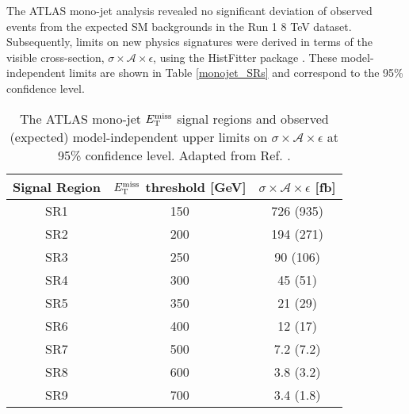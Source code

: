 The ATLAS mono-jet analysis revealed no significant deviation of observed events from the expected SM backgrounds in the Run 1 8 TeV dataset. Subsequently, limits on new physics signatures were derived in terms of the visible cross-section, $\sigma\times\mathcal{A}\times\epsilon$, using the HistFitter package \cite{}. These model-independent limits are shown in Table \ref{monojet_SRs} and correspond to the 95\% confidence level.

\begin{table}[!htbp]
\centering
\begin{tabular}{c|c|c}
 \hline
 \hline
 Signal Region & $E_{\mathrm{T}}^{\mathrm{miss}}$ threshold [GeV] & $\sigma \times \mathcal{A} \times \epsilon$ [fb] \\ %
 \hline
 SR1 & 150 & 726 (935) \\ %
 SR2 & 200 & 194 (271) \\ %
 SR3 & 250 & 90 (106) \\ %
 SR4 & 300 & 45 (51) \\ %
 SR5 & 350 & 21 (29) \\ %
 SR6 & 400 & 12 (17) \\ %
 SR7 & 500 & 7.2 (7.2) \\ %
 SR8 & 600 & 3.8 (3.2) \\ %
 SR9 & 700 & 3.4 (1.8) \\ %
 \hline
 \hline
\end{tabular}
\caption{The ATLAS mono-jet $E_{\mathrm{T}}^{\mathrm{miss}}$ signal regions and  observed (expected) model-independent upper limits on $\sigma \times \mathcal{A} \times \epsilon$ at 95\% confidence level. Adapted from Ref. \cite{Aad:2015zva}.
}
\end{table}

